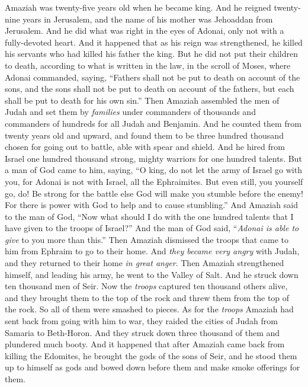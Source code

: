 \begin{biblechapter} %
 Amaziah was twenty-five years old when he became king. And he reigned twenty-nine years in Jerusalem, and the name of his mother was Jehoaddan from Jerusalem.
\verse And he did what was right in the eyes of Adonai, only not with a fully-devoted heart.
\verse And it happened that as his reign was strengthened, he killed his servants who had killed his father the king.
\verse But he did not put their children to death, according to what is written in the law, in the scroll of Moses, where Adonai commanded, saying, “Fathers shall not be put to death on account of the sons, and the sons shall not be put to death on account of the fathers, but each shall be put to death for his own sin.”
\verse Then Amaziah assembled the men of Judah and set them by \textit{families} under commanders of thousands and commanders of hundreds for all Judah and Benjamin. And he counted them from twenty years old and upward, and found them to be three hundred thousand chosen for going out to battle, able with spear and shield.
\verse And he hired from Israel one hundred thousand strong, mighty warriors for one hundred talents.
\verse But a man of God came to him, saying, “O king, do not let the army of Israel go with you, for Adonai is not with Israel, all the Ephraimites.
\verse But even still, you yourself go, do! Be strong for the battle else God will make you stumble before the enemy! For there is power with God to help and to cause stumbling.”
\verse And Amaziah said to the man of God, “Now what should I do with the one hundred talents that I have given to the troops of Israel?” And the man of God said, “\textit{Adonai is able to give} to you more than this.”
\verse Then Amaziah dismissed the troops that came to him from Ephraim to go to their home. And \textit{they became very angry} with Judah, and they returned to their home \textit{in great anger}.
\verse Then Amaziah strengthened himself, and leading his army, he went to the Valley of Salt. And he struck down ten thousand men of Seir.
\verse Now the \textit{troops} captured ten thousand others alive, and they brought them to the top of the rock and threw them from the top of the rock. So all of them were smashed to pieces.
\verse As for the \textit{troops} Amaziah had sent back from going with him to war, they raided the cities of Judah from Samaria to Beth-Horon. And they struck down three thousand of them and plundered much booty.
\verse And it happened that after Amaziah came back from killing the Edomites, he brought the gods of the sons of Seir, and he stood them up to himself as gods and bowed down before them and make smoke offerings for them.

\end{biblechapter}
